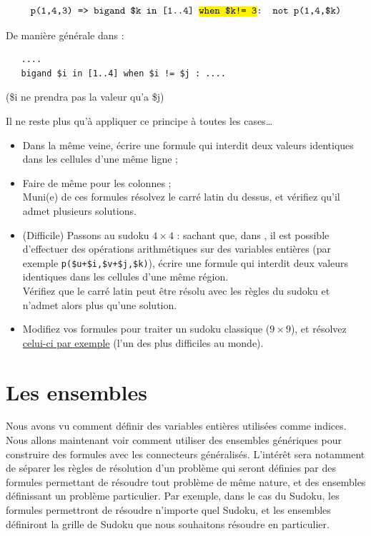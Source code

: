 \[\texttt{p(1,4,3) => bigand \$k in [1..4] \hl{when \$k!= 3}: not p(1,4,\$k)}\]

De manière générale dans : 
\begin{verbatim}
   ....
   bigand $i in [1..4] when $i != $j : ....
\end{verbatim}
(\$i ne prendra pas la valeur qu'a \$j)

Il ne reste plus qu'à appliquer ce principe à toutes les cases\ldots

\begin{itemize}
    \item Dans la même veine, écrire une formule qui interdit deux valeurs identiques dans les cellules d'une même ligne ;
    \item Faire de même pour les colonnes ;\\
    Muni(e) de ces formules résolvez le carré latin du dessus, et vérifiez qu'il admet plusieurs solutions. 
    \item (Difficile) Passons au sudoku $4\times 4$ : sachant que, dans \touist, il est possible d'effectuer des opérations arithmétiques sur des variables entières (par exemple \texttt{p(\$u+\$i,\$v+\$j,\$k)}), écrire une formule qui interdit deux valeurs identiques dans les cellules d'une même région.\\
    Vérifiez que le carré latin peut être résolu avec les règles du sudoku et n'admet alors plus qu'une solution. 
    
\item Modifiez vos formules pour traiter un sudoku classique ($9\times 9$), et résolvez \href{http://puzzling.stackexchange.com/questions/252/how-do-i-solve-the-worlds-hardest-sudoku}{celui-ci par exemple} (l'un des plus difficiles au monde). 
\end{itemize}

\section{Les ensembles}

Nous avons vu comment définir des variables entières utilisées comme indices.
Nous allons maintenant voir comment utiliser des ensembles génériques pour construire des formules avec les connecteurs généralisés. L'intérêt sera notamment de séparer les règles de résolution d'un problème qui seront définies par des formules permettant de résoudre tout problème de même nature, et des ensembles définissant un problème particulier. Par exemple, dans le cas du Sudoku, les formules permettront de résoudre n'importe quel Sudoku, et les ensembles définiront la grille de Sudoku que nous souhaitons résoudre en particulier.\\


